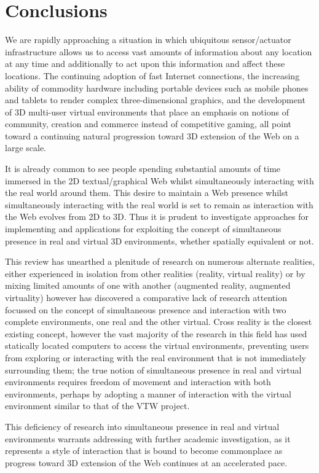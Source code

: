 \section{Conclusions}
We are rapidly approaching a situation in which ubiquitous sensor/actuator infrastructure allows us to access vast amounts of information about any location at any time and additionally to act upon this information and affect these locations. The continuing adoption of fast Internet connections, the increasing ability of commodity hardware including portable devices such as mobile phones and tablets to render complex three-dimensional graphics, and the development of 3D multi-user virtual environments that place an emphasis on notions of community, creation and commerce instead of competitive gaming, all point toward a continuing natural progression toward 3D extension of the Web on a large scale.

It is already common to see people spending substantial amounts of time immersed in the 2D textual/graphical Web whilst simultaneously interacting with the real world around them. This desire to maintain a Web presence whilst simultaneously interacting with the real world is set to remain as interaction with the Web evolves from 2D to 3D. Thus it is prudent to investigate approaches for implementing and applications for exploiting the concept of simultaneous presence in real and virtual 3D environments, whether spatially equivalent or not.

This review has unearthed a plenitude of research on numerous alternate realities, either experienced in isolation from other realities (reality, virtual reality) or by mixing limited amounts of one with another (augmented reality, augmented virtuality) however has discovered a comparative lack of research attention focussed on the concept of simultaneous presence and interaction with two complete environments, one real and the other virtual. Cross reality is the closest existing concept, however the vast majority of the research in this field has used statically located computers to access the virtual environments, preventing users from exploring or interacting with the real environment that is not immediately surrounding them; the true notion of simultaneous presence in real and virtual environments requires freedom of movement and interaction with both environments, perhaps by adopting a manner of interaction with the virtual environment similar to that of the VTW project.

This deficiency of research into simultaneous presence in real and virtual environments warrants addressing with further academic investigation, as it represents a style of interaction that is bound to become commonplace as progress toward 3D extension of the Web continues at an accelerated pace.
